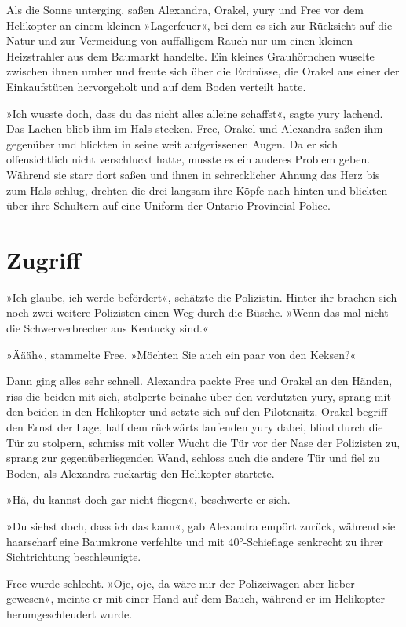 Als die Sonne unterging, saßen Alexandra, Orakel, yury und Free vor dem Helikopter an einem kleinen »Lagerfeuer«, bei dem es sich zur Rücksicht auf die Natur und zur Vermeidung von auffälligem Rauch nur um einen kleinen Heizstrahler aus dem Baumarkt handelte. Ein kleines Grauhörnchen wuselte zwischen ihnen umher und freute sich über die Erdnüsse, die Orakel aus einer der Einkaufstüten hervorgeholt und auf dem Boden verteilt hatte.

»Ich wusste doch, dass du das nicht alles alleine schaffst«, sagte yury lachend. Das Lachen blieb ihm im Hals stecken. Free, Orakel und Alexandra saßen ihm gegenüber und blickten in seine weit aufgerissenen Augen. Da er sich offensichtlich nicht verschluckt hatte, musste es ein anderes Problem geben. Während sie starr dort saßen und ihnen in schrecklicher Ahnung das Herz bis zum Hals schlug, drehten die drei langsam ihre Köpfe nach hinten und blickten über ihre Schultern auf eine Uniform der Ontario Provincial Police.


\chapter{Zugriff}

»Ich glaube, ich werde befördert«, schätzte die Polizistin. Hinter ihr brachen sich noch zwei weitere Polizisten einen Weg durch die Büsche. »Wenn das mal nicht die Schwerverbrecher aus Kentucky sind.«

»Äääh«, stammelte Free. »Möchten Sie auch ein paar von den Keksen?«

Dann ging alles sehr schnell. Alexandra packte Free und Orakel an den Händen, riss die beiden mit sich, stolperte beinahe über den verdutzten yury, sprang mit den beiden in den Helikopter und setzte sich auf den Pilotensitz. Orakel begriff den Ernst der Lage, half dem rückwärts laufenden yury dabei, blind durch die Tür zu stolpern, schmiss mit voller Wucht die Tür vor der Nase der Polizisten zu, sprang zur gegenüberliegenden Wand, schloss auch die andere Tür und fiel zu Boden, als Alexandra ruckartig den Helikopter startete.

»Hä, du kannst doch gar nicht fliegen«, beschwerte er sich.

»Du siehst doch, dass ich das kann«, gab Alexandra empört zurück, während sie haarscharf eine Baumkrone verfehlte und mit 40°-Schieflage senkrecht zu ihrer Sichtrichtung beschleunigte.

Free wurde schlecht. »Oje, oje, da wäre mir der Polizeiwagen aber lieber gewesen«, meinte er mit einer Hand auf dem Bauch, während er im Helikopter herumgeschleudert wurde.

